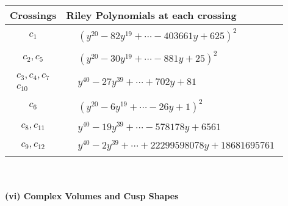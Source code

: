\documentclass[1p]{elsarticle_modified}
\theoremstyle{definition}
\begin{document}
\begin{tabular}{m{50pt}|m{274pt}}
Crossings & \hspace{64pt}Riley Polynomials at each crossing \\
\hline $$\begin{aligned}c_{1}\end{aligned}$$&$\begin{aligned}
&(y^{20}-82 y^{19}+\cdots-403661 y+625)^{2}
\end{aligned}$\\
\hline $$\begin{aligned}c_{2},c_{5}\end{aligned}$$&$\begin{aligned}
&(y^{20}-30 y^{19}+\cdots-881 y+25)^{2}
\end{aligned}$\\
\hline $$\begin{aligned}c_{3},c_{4},c_{7}\\c_{10}\end{aligned}$$&$\begin{aligned}
&y^{40}-27 y^{39}+\cdots+702 y+81
\end{aligned}$\\
\hline $$\begin{aligned}c_{6}\end{aligned}$$&$\begin{aligned}
&(y^{20}-6 y^{19}+\cdots-26 y+1)^{2}
\end{aligned}$\\
\hline $$\begin{aligned}c_{8},c_{11}\end{aligned}$$&$\begin{aligned}
&y^{40}-19 y^{39}+\cdots-578178 y+6561
\end{aligned}$\\
\hline $$\begin{aligned}c_{9},c_{12}\end{aligned}$$&$\begin{aligned}
&y^{40}-2 y^{39}+\cdots+22299598078 y+18681695761
\end{aligned}$\\
\hline
\end{tabular}\\~\\
\newpage\flushleft \textbf{(vi) Complex Volumes and Cusp Shapes}
\end{document}
